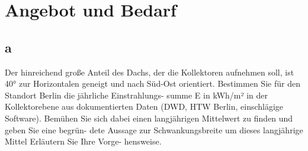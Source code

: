 \section{Angebot und Bedarf}
\label{sec:Angebot und Bedarf}
\subsection{a}
Der hinreichend große Anteil des Dachs, der die Kollektoren aufnehmen soll, ist 40° zur Horizontalen
geneigt und nach Süd-Ost orientiert. Bestimmen Sie für den Standort Berlin die jährliche Einstrahlungs-
summe E in kWh/m² in der Kollektorebene aus dokumentierten Daten (DWD, HTW Berlin, einschlägige
Software). Bemühen Sie sich dabei einen langjährigen Mittelwert zu finden und geben Sie eine begrün-
dete Aussage zur Schwankungsbreite um dieses langjährige Mittel
  Erläutern Sie Ihre Vorge-
hensweise.
